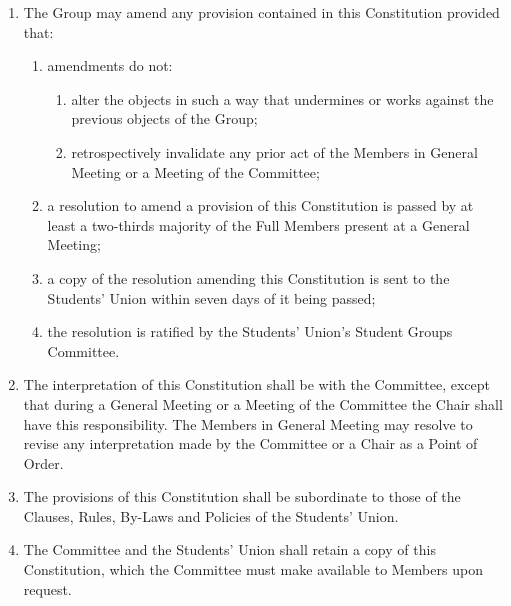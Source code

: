\documentclass[12pt]{constitution}
\begin{document}
\begin{enumerate}
    \item The Group may amend any provision contained in this Constitution provided that:
    \begin{enumerate}
        \item amendments do not:
        \begin{enumerate}
            \item alter the objects in such a way that undermines or works against the previous objects of the Group;
            \item retrospectively invalidate any prior act of the Members in General Meeting or a Meeting of the Committee;
        \end{enumerate}

        \item a resolution to amend a provision of this Constitution is passed by at least a two-thirds majority of the Full Members present at a General Meeting;
        \item a copy of the resolution amending this Constitution is sent to the Students' Union within seven days of it being passed;
        \item the resolution is ratified by the Students' Union's Student Groups Committee.
    \end{enumerate}

    \item The interpretation of this Constitution shall be with the Committee, except that during a General Meeting or a Meeting of the Committee the Chair shall have this responsibility.  The Members in General Meeting may resolve to revise any interpretation made by the Committee or a Chair as a Point of Order.
    \item The provisions of this Constitution shall be subordinate to those of the Clauses, Rules, By-Laws and Policies of the Students' Union.
    \item The Committee and the Students' Union shall retain a copy of this Constitution, which the Committee must make available to Members upon request.
\end{enumerate}


\label{clause:dissolution}
\end{document}

